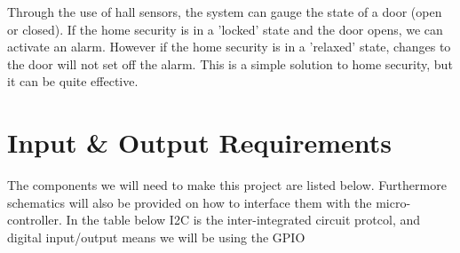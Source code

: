 \documentclass[]{report}
\begin{document}
Through the use of hall sensors, the system can gauge the state of a door (open or closed). If the home security is in a 'locked' state and the door opens, we can activate an alarm. However if the home security is in a 'relaxed' state, changes to the door will not set off the alarm. This is a simple solution to home security, but it can be quite effective.

\section*{Input \& Output Requirements}
The components we will need to make this project are listed below. Furthermore schematics will also be provided on how to interface them with the micro-controller. In the table below I2C is the inter-integrated circuit protcol, and digital input/output means we will be using the GPIO
\end{document}
